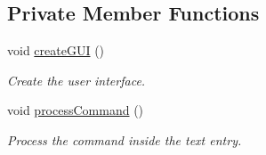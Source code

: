 \subsection*{Private Member Functions}
\begin{DoxyCompactItemize}
\item 
void \hyperlink{classUserInterface_a5aa4ca5e24c9fce93ef91e5a6d0abd60}{create\-G\-U\-I} ()
\begin{DoxyCompactList}\small\item\em Create the user interface. \end{DoxyCompactList}\item 
void \hyperlink{classUserInterface_a8729aa2e61c87f957663577707f449a5}{process\-Command} ()
\begin{DoxyCompactList}\small\item\em Process the command inside the text entry. \end{DoxyCompactList}\end{DoxyCompactItemize}
